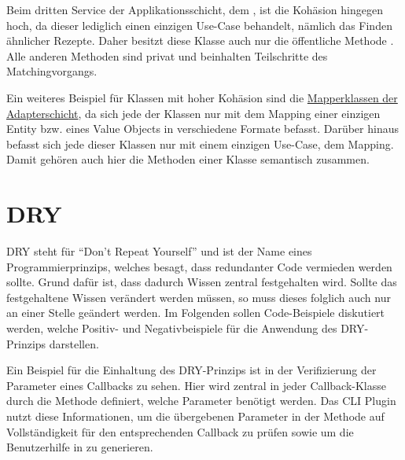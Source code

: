 Beim dritten Service der Applikationsschicht, dem \href{https://github.com/anditru/quickie/blob/bb41442c7f1ffbfcd3117cd86a40f7932e543a33/2-quickie-application/src/main/java/org/pinkcrazyunicorn/quickie/application/recipe/MatchingService.java}{}, ist die Kohäsion hingegen hoch, da dieser lediglich einen einzigen Use-Case behandelt, nämlich das Finden ähnlicher Rezepte. Daher besitzt diese Klasse auch nur die öffentliche Methode \href{https://github.com/anditru/quickie/blob/bb41442c7f1ffbfcd3117cd86a40f7932e543a33/2-quickie-application/src/main/java/org/pinkcrazyunicorn/quickie/application/recipe/MatchingService.java#L20}{}. Alle anderen Methoden sind privat und beinhalten Teilschritte des Matchingvorgangs.

Ein weiteres Beispiel für Klassen mit hoher Kohäsion sind die \href{https://github.com/anditru/quickie/tree/bb41442c7f1ffbfcd3117cd86a40f7932e543a33/1-quickie-adapters/src/main/java/org/pinkcrazyunicorn/quickie/adapters/mappers}{Mapperklassen der Adapterschicht}, da sich jede der Klassen nur mit dem Mapping einer einzigen Entity bzw. eines Value Objects in verschiedene Formate befasst. Darüber hinaus befasst sich jede dieser Klassen nur mit einem einzigen Use-Case, dem Mapping. Damit gehören auch hier die Methoden einer Klasse semantisch zusammen.

\section{DRY}
DRY steht für \enquote{Don't Repeat Yourself} und ist der Name eines Programmierprinzips, welches besagt, dass redundanter Code vermieden werden sollte. Grund dafür ist, dass dadurch Wissen zentral festgehalten wird. Sollte das festgehaltene Wissen verändert werden müssen, so muss dieses folglich auch nur an einer Stelle geändert werden. Im Folgenden sollen Code-Beispiele diskutiert werden, welche Positiv- und Negativbeispiele für die Anwendung des DRY-Prinzips darstellen.

Ein Beispiel für die Einhaltung des DRY-Prinzips ist in der Verifizierung der Parameter eines Callbacks zu sehen. Hier wird zentral in jeder Callback-Klasse durch die Methode \href{https://github.com/anditru/quickie/blob/bb41442c7f1ffbfcd3117cd86a40f7932e543a33/1-quickie-adapters/src/main/java/org/pinkcrazyunicorn/quickie/adapters/event/EventCallback.java#L8}{} definiert, welche Parameter benötigt werden. Das CLI Plugin nutzt diese Informationen, um die übergebenen Parameter in der Methode \href{https://github.com/anditru/quickie/blob/bb41442c7f1ffbfcd3117cd86a40f7932e543a33/0-quickie-plugin-cli/src/main/java/org/pinkcrazyunicorn/quickie/plugins/cli/CommandLineUI.java#L107}{} auf Vollständigkeit für den entsprechenden Callback zu prüfen sowie um die Benutzerhilfe in \href{https://github.com/anditru/quickie/blob/bb41442c7f1ffbfcd3117cd86a40f7932e543a33/0-quickie-plugin-cli/src/main/java/org/pinkcrazyunicorn/quickie/plugins/cli/CommandLineUI.java#L48}{} zu generieren.

